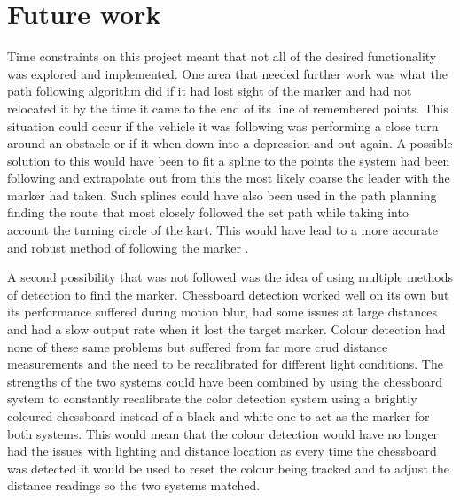 \section{Future work}
Time constraints on this project meant that not all of the desired functionality was explored and implemented. One area that needed further work was what the path following algorithm did if it had lost sight of the marker and had not relocated it by the time it came to the end of its line of remembered points. This situation could occur if the vehicle it was following was performing a close turn around an obstacle or if it when down into a depression and out again. A possible solution to this would have been to fit a spline to the points the system had been following and extrapolate out from this the most likely coarse the leader with the marker had taken. Such splines could have also been used in the path planning finding the route that most closely followed the set path while taking into account the turning circle of the kart. This would have lead to a more accurate and robust method of following the marker \cite{path}. 

A second possibility that was not followed was the idea of using multiple methods of detection to find the marker. Chessboard detection worked well on its own but its performance suffered during motion blur, had some issues at large distances and had a slow output rate when it lost the target marker. Colour detection had none of these same problems but suffered from far more crud distance measurements and the need to be recalibrated for different light conditions. The strengths of the two systems could have been combined by using the chessboard system to constantly recalibrate the color detection system using a brightly coloured chessboard instead of a black and white one to act as the marker for both systems. This would mean that the colour detection would have no longer had the issues with lighting and distance location as every time the chessboard was detected it would be used to reset the colour being tracked and to adjust the distance readings so the two systems matched.